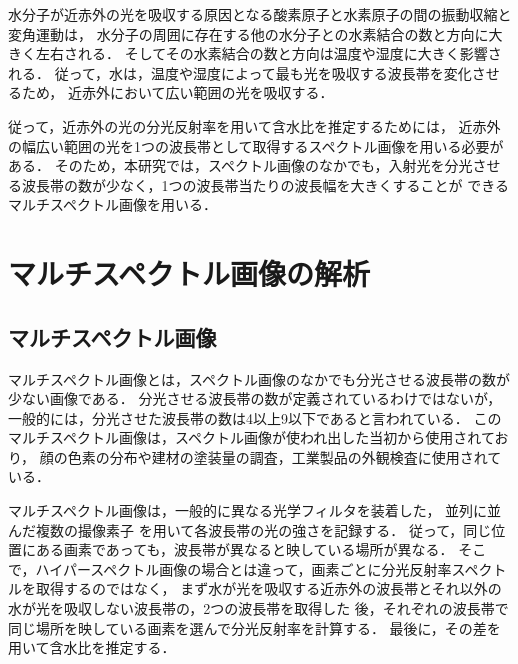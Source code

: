 水分子が近赤外の光を吸収する原因となる酸素原子と水素原子の間の振動収縮と変角運動は，
水分子の周囲に存在する他の水分子との水素結合の数と方向に大きく左右される\cite{中島2015}．
そしてその水素結合の数と方向は温度や湿度に大きく影響される\cite{角田2013}．
従って，水は，温度や湿度によって最も光を吸収する波長帯を変化させるため，
近赤外において広い範囲の光を吸収する．


従って，近赤外の光の分光反射率を用いて含水比を推定するためには，
近赤外の幅広い範囲の光を1つの波長帯として取得するスペクトル画像を用いる必要がある．
そのため，本研究では，スペクトル画像のなかでも，入射光を分光させる波長帯の数が少なく，1つの波長帯当たりの波長幅を大きくすることが
できるマルチスペクトル画像を用いる．

\clearpage


\section{マルチスペクトル画像の解析}
\label{sec:AnalysisOfMultispectralImage}

\subsection{マルチスペクトル画像}
\label{ssec:MultispectralImage}

マルチスペクトル画像とは，スペクトル画像のなかでも分光させる波長帯の数が少ない画像である．
分光させる波長帯の数が定義されているわけではないが，
一般的には，分光させた波長帯の数は4以上9以下であると言われている．%
このマルチスペクトル画像は，スペクトル画像が使われ出した当初から使用されており，
顔の色素の分布や建材の塗装量の調査，工業製品の外観検査に使用されている\cite{中野1996}\cite{長田2004}\cite{田代2013}．%

マルチスペクトル画像は，一般的に異なる光学フィルタを装着した，
並列に並んだ複数の撮像素子
を用いて各波長帯の光の強さを記録する．
従って，同じ位置にある画素であっても，波長帯が異なると映している場所が異なる．
そこで，ハイパースペクトル画像の場合とは違って，画素ごとに分光反射率スペクトルを取得するのではなく，
まず水が光を吸収する近赤外の波長帯とそれ以外の水が光を吸収しない波長帯の，2つの波長帯を取得した
後，それぞれの波長帯で同じ場所を映している画素を選んで分光反射率を計算する．
最後に，その差を用いて含水比を推定する．

